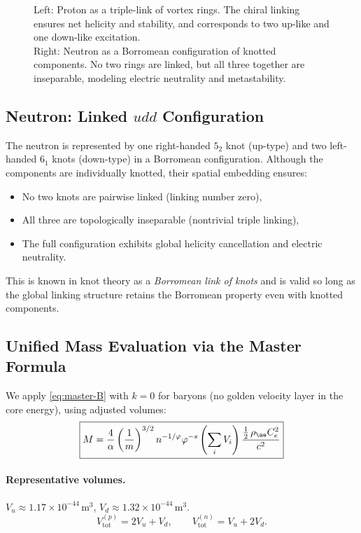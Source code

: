 \documentclass[12pt]{article}
\begin{document}
\begin{figure}[H]
\begin{minipage}{0.25\textwidth}
\end{minipage}
    \caption{Left: Proton as a triple-link of vortex rings. The chiral linking ensures net helicity and stability, and corresponds to two up-like and one down-like excitation.\\
      Right: Neutron as a Borromean configuration of knotted components. No two rings are linked, but all three together are inseparable, modeling electric neutrality and metastability.}
\end{figure}

\subsection{Neutron: Linked \(udd\) Configuration}

The neutron is represented by one right-handed \( 5_2 \) knot (up-type) and two left-handed \( 6_1 \) knots (down-type) in a Borromean configuration. Although the components are individually knotted, their spatial embedding ensures:

\begin{itemize}
    \item No two knots are pairwise linked (linking number zero),
    \item All three are topologically inseparable (nontrivial triple linking),
    \item The full configuration exhibits global helicity cancellation and electric neutrality.
\end{itemize}

This is known in knot theory as a \emph{Borromean link of knots} and is valid so long as the global linking structure retains the Borromean property even with knotted components.


  \subsection{Unified Mass Evaluation via the Master Formula}
  We apply \eqref{eq:master-B} with \(k=0\) for baryons (no golden velocity layer in the core energy), using adjusted volumes:
  \begin{equation}
      \boxed{
          M = \frac{4}{\alpha} \left(\frac{1}{m}\right)^{3/2} n^{-1/\varphi} \varphi^{-s}
          \left(\sum_i V_i\right)
          \frac{\tfrac12\,\rho_{\ae} C_e^2}{c^2}
      }
  \end{equation}

  \paragraph{Representative volumes.}
  \(V_u \approx 1.17\times 10^{-44}\,\mathrm{m}^3\),
  \(V_d \approx 1.32\times 10^{-44}\,\mathrm{m}^3\).
  \[
      V_{\text{tot}}^{(p)}=2V_u+V_d,\qquad
      V_{\text{tot}}^{(n)}=V_u+2V_d.
  \]
\end{document}
